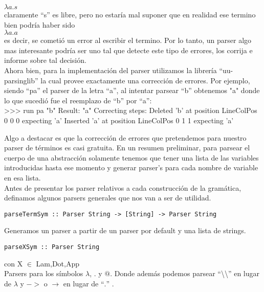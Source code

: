 \documentclass[a4paper,10pt]{article}
\newenvironment{code}{\footnotesize\verbatim}{\endverbatim\normalsize}
\begin{document}
$\lambda a . s$\\

claramente ``s'' es libre, pero no estaría mal suponer que en realidad ese termino
bien podría haber sido\\

$\lambda a . a$\\

es decir, se cometió un error al escribir el termino. Por lo tanto, un parser
algo mas interesante podría ser uno tal que detecte este tipo de errores, los
corrija e informe sobre tal decisión.\\

Ahora bien, para la implementación del parser utilizamos la librería ``uu-parsinglib''
la cual provee exactamente una corrección de errores. Por ejemplo, siendo ``pa''
el parser de la letra ``a'', al intentar parsear ``b'' obtenemos "a" donde lo que
sucedió fue el reemplazo de ``b'' por ``a'':\\

\begin{code}
 >>> run pa  "b"
     Result: "a"
     Correcting steps: 
       Deleted   'b' at position LineColPos 0 0 0 expecting 'a'
       Inserted  'a' at position LineColPos 0 1 1 expecting 'a'
\end{code}

Algo a destacar es que la corrección de errores que pretendemos para nuestro
parser de términos es casi gratuita. En un resumen preliminar, para parsear el
cuerpo de una abstracción solamente tenemos que tener una lista de las variables
introducidas hasta ese momento y generar parser's para cada nombre de variable
en esa lista.\\

Antes de presentar los parser relativos a cada construcción de la gramática,
definamos algunos parsers generales que nos van a ser de utilidad.

\begin{lstlisting}
parseTermSym :: Parser String -> [String] -> Parser String
\end{lstlisting}
Generamos un parser a partir de un parser por default y una lista de strings.

\begin{lstlisting}
parseXSym :: Parser String
\end{lstlisting} con X $\in$ {Lam,Dot,App}\\

Parsers para los símbolos $\lambda$, $.$ y $@$. Donde además podemos parsear 
``\textbackslash \textbackslash'' en lugar de $\lambda$ y $->$ o $\rightarrow$
en lugar de ``$.$'' .
\end{document}
